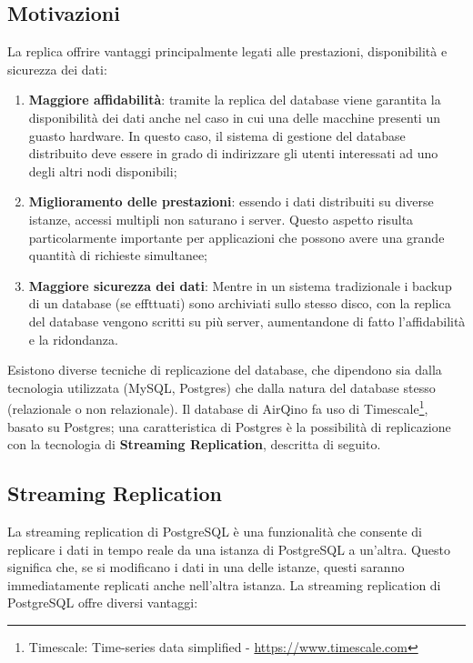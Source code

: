 \subsection{Motivazioni}\label{ssec:replica-motivazioni}
La replica offrire vantaggi principalmente legati alle prestazioni, disponibilità e sicurezza dei dati:
\begin{enumerate}
  \item \textbf{Maggiore affidabilità}: tramite la replica del database viene garantita la disponibilità dei dati anche nel caso in cui una delle macchine presenti un guasto hardware. In questo caso, il sistema di gestione del database distribuito deve essere in grado di indirizzare gli utenti interessati ad uno degli altri nodi disponibili;
  \item \textbf{Miglioramento delle prestazioni}: essendo i dati distribuiti su diverse istanze, accessi multipli non saturano i server. Questo aspetto risulta particolarmente importante per applicazioni che possono avere una grande quantità di richieste simultanee;
  \item \textbf{Maggiore sicurezza dei dati}: Mentre in un sistema tradizionale i backup di un database (se effttuati) sono archiviati sullo stesso disco, con la replica del database vengono scritti su più server, aumentandone di fatto l'affidabilità e la ridondanza.
\end{enumerate}

Esistono diverse tecniche di replicazione del database, che dipendono sia dalla tecnologia utilizzata (MySQL, Postgres) che dalla natura del database stesso (relazionale o non relazionale). Il database di AirQino fa uso di Timescale\footnote{Timescale: Time-series data simplified - \url{https://www.timescale.com}}, basato su Postgres; una caratteristica di Postgres è la possibilità di replicazione con la tecnologia di \textbf{Streaming Replication}, descritta di seguito.

\subsection{Streaming Replication}\label{ssec:streaming-replication}
La streaming replication di PostgreSQL è una funzionalità che consente di replicare i dati in tempo reale da una istanza di PostgreSQL a un'altra. Questo significa che, se si modificano i dati in una delle istanze, questi saranno immediatamente replicati anche nell'altra istanza. La streaming replication di PostgreSQL offre diversi vantaggi:

